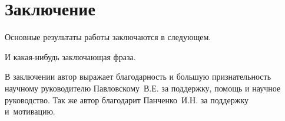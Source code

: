 \chapter*{Заключение}						%


Основные результаты работы заключаются в следующем.

И какая-нибудь заключающая фраза.


В заключении автор выражает благодарность и большую признательность научному руководителю Павловскому~В.\:Е.
за поддержку, помощь и научное руководство. Так же автор благодарит Панченко~И.\:Н. за поддержку и~мотивацию.